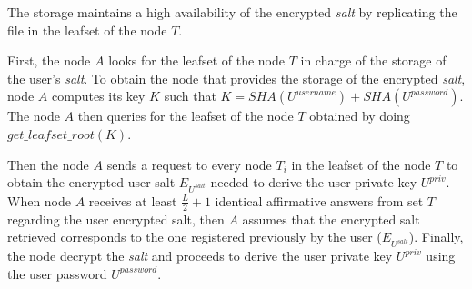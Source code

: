 The storage maintains a high availability of the encrypted \textit{salt} by
replicating the file in the leafset of the node $T$.

First, the node $A$ looks for the leafset of the node $T$ in charge of the storage
of the user's \textit{salt}.
To obtain the node that provides the storage of the encrypted \textit{salt},
node $A$ computes its key $K$ such that $K =
SHA(U^{username})+SHA(U^{password})$.
The node $A$ then queries for the leafset of the node $T$ obtained by doing
$get\_leafset\_root(K)$.

Then the node $A$ sends a request to every node $T_i$ in the leafset of the
node $T$ to obtain the encrypted user
salt $E_{U^{salt}}$ needed to derive the user private key $U^{priv}$.
 When node $A$ receives at least $\frac{L}{2} + 1$ identical affirmative answers from
set $T$ regarding the user encrypted salt, then $A$ assumes that the encrypted salt retrieved
corresponds to the one registered previously by the user ($E_{U^{salt}}$). Finally,
the node decrypt the \textit{salt} and proceeds to derive the user private key $U^{priv}$ using the user password $U^{password}$.


%


